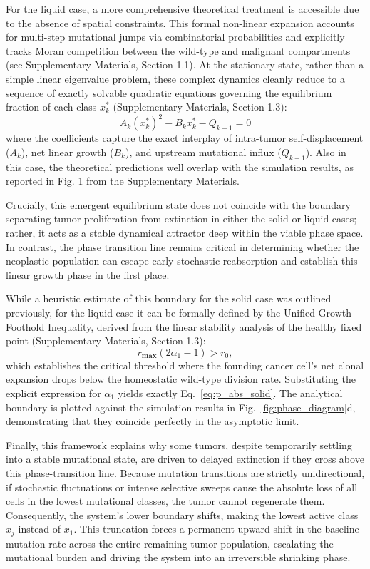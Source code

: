 \documentclass[10pt, aps, rmp,  twocolumn, superscriptaddress, floatfix, showkeys]{revtex4-2}
\begin{document}
For the liquid case, a more comprehensive theoretical treatment is accessible due to the absence of spatial constraints. This formal non-linear expansion accounts for multi-step mutational jumps via combinatorial probabilities and explicitly tracks Moran competition between the wild-type and malignant compartments (see Supplementary Materials, Section 1.1). At the stationary state, rather than a simple linear eigenvalue problem, these complex dynamics cleanly reduce to a sequence of exactly solvable quadratic equations governing the equilibrium fraction of each class $x_k^*$ (Supplementary Materials, Section 1.3):
\begin{equation}
    A_k(x_k^*)^2-B_kx_k^*-Q_{k-1}=0
\end{equation}
where the coefficients capture the exact interplay of intra-tumor self-displacement ($A_k$), net linear growth ($B_k$), and upstream mutational influx ($Q_{k-1}$). Also in this case, the theoretical predictions well overlap with the simulation results, as reported in Fig. 1 from the Supplementary Materials.

Crucially, this emergent equilibrium state does not coincide with the boundary separating tumor proliferation from extinction in either the solid or liquid cases; rather, it acts as a stable dynamical attractor deep within the viable phase space. In contrast, the phase transition line remains critical in determining whether the neoplastic population can escape early stochastic reabsorption and establish this linear growth phase in the first place.

While a heuristic estimate of this boundary for the solid case was outlined previously, for the liquid case it can be formally defined by the Unified Growth Foothold Inequality, derived from the linear stability analysis of the healthy fixed point (Supplementary Materials, Section 1.3):
\begin{equation}
r_{\textbf{max}}(2\alpha_1 - 1) > r_0,
\end{equation}
which establishes the critical threshold where the founding cancer cell's net clonal expansion drops below the homeostatic wild-type division rate. Substituting the explicit expression for $\alpha_1$ yields exactly Eq.~\eqref{eq:p_abs_solid}. The analytical boundary is plotted against the simulation results in Fig.~\ref{fig:phase_diagram}d, demonstrating that they coincide perfectly in the asymptotic limit.

Finally, this framework explains why some tumors, despite temporarily settling into a stable mutational state, are driven to delayed extinction if they cross above this phase-transition line. Because mutation transitions are strictly unidirectional, if stochastic fluctuations or intense selective sweeps cause the absolute loss of all cells in the lowest mutational classes, the tumor cannot regenerate them. Consequently, the system's lower boundary shifts, making the lowest active class $x_j$ instead of $x_1$. This truncation forces a permanent upward shift in the baseline mutation rate across the entire remaining tumor population, escalating the mutational burden and driving the system into an irreversible shrinking phase.
\end{document}
